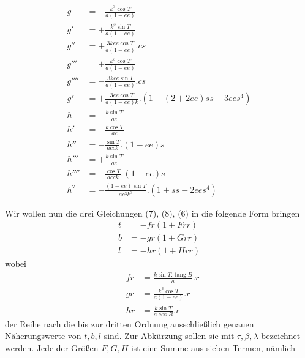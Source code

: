%
\[
\begin{aligned}
g&=-\frac{k^3\cos T}{a(1-ee)}\\
g'&=+\frac{k^3\sin T}{a(1-ee)}\\
g''&=+\frac{3kee\cos T}{a(1-ee)}\mathord{.}cs\\
g'''&=+\frac{k^3\cos T}{a(1-ee)}\\
g''''&=-\frac{3kee\sin T}{a(1-ee)}\mathord{.}cs\\
g^{\mathrm{v}}&=+\frac{3ee\cos T}{a(1-ee)k}\mathord{.}(1-(2+2ee)ss+3ees^4)\\
h&=-\frac{k\sin T}{ac}\\
h'&=-\frac{k\cos T}{ac}\\
h''&=-\frac{\sin T}{acck}\mathord{.}(1-ee)s\\
h'''&=+\frac{k\sin T}{ac}\\
h''''&=-\frac{\cos T}{acck}\mathord{.}(1-ee)s\\
h^{\mathrm{v}}&=-\frac{(1-ee)\sin T}{ac^3k^3}\mathord{.}(1+ss-2ees^4)
\end{aligned}
\]

Wir wollen nun die drei Gleichungen (7), (8), (6) in die folgende Form bringen
\[
\begin{aligned}
t&=-fr(1+Frr)\\
b&=-gr(1+Grr)\\
l&=-hr(1+Hrr)
\end{aligned}
\]
wobei
\[
\begin{aligned}
-fr&=\frac{k\sin T\mathord{.}\operatorname{tang}B}{a}\mathord{.}r\\
-gr&=\frac{k^3\cos T}{a(1-ee)}\mathord{.}r\\
-hr&=\frac{k\sin T}{a\cos B}\mathord{.}r
\end{aligned}
\]
der Reihe nach die bis zur dritten Ordnung ausschließlich genauen Näherungswerte von \(t,b,l\) sind. Zur Abkürzung sollen sie mit \(\tau,\beta,\lambda\) bezeichnet werden. Jede der Größen \(F,G,H\) ist eine Summe aus sieben Termen, nämlich
